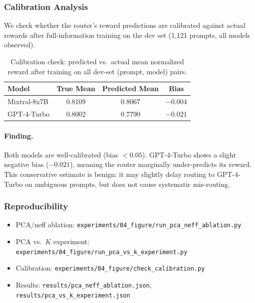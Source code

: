 \subsubsection{Calibration Analysis}
\label{appendix:calibration}

We check whether the router's reward predictions are calibrated against actual
rewards after full-information training on the dev set (1,121 prompts, all
models observed).

\begin{table}[h]
\centering
\caption{Calibration check: predicted vs.\ actual mean normalized reward
after training on all dev-set (prompt, model) pairs.}
\label{tab:calibration}
\small
\begin{tabular}{@{}lccc@{}}
\toprule
\textbf{Model} & \textbf{True Mean} & \textbf{Predicted Mean} & \textbf{Bias} \\
\midrule
Mixtral-8x7B   & 0.8109 & 0.8067 & $-0.004$ \\
GPT-4-Turbo    & 0.8002 & 0.7790 & $-0.021$ \\
\bottomrule
\end{tabular}
\end{table}

\paragraph{Finding.}
Both models are well-calibrated (bias $< 0.05$).  GPT-4-Turbo shows a
slight negative bias ($-0.021$), meaning the router marginally
under-predicts its reward.  This conservative estimate is benign: it may
slightly delay routing to GPT-4-Turbo on ambiguous prompts, but does not
cause systematic mis-routing.

\subsubsection{Reproducibility}

\begin{itemize}[noitemsep]
    \item PCA/neff ablation: \texttt{experiments/04\_figure/run\_pca\_neff\_ablation.py}
    \item PCA vs.\ $K$ experiment: \texttt{experiments/04\_figure/run\_pca\_vs\_k\_experiment.py}
    \item Calibration: \texttt{experiments/04\_figure/check\_calibration.py}
    \item Results: \texttt{results/pca\_neff\_ablation.json}, \texttt{results/pca\_vs\_k\_experiment.json}
\end{itemize}
